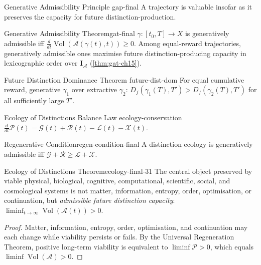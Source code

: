 \documentclass[12pt,twoside,openright]{book}
\newcommand{\adm}{\mathcal{A}}
\newcommand{\Vol}{\operatorname{Vol}}
\begin{document}
\begin{principle}{Generative Admissibility Principle}%
  {gap-final}
  A trajectory is valuable insofar as it preserves the
  capacity for future distinction-production.
\end{principle}

\begin{theorem}{Generative Admissibility Theorem}{gat-final}
  $\gamma:[t_0,T]\to X$ is generatively admissible iff
  $\frac{d}{dt}\Vol(\adm(\gamma(t),t))\ge0$.
  Among equal-reward trajectories, generatively admissible
  ones maximise future distinction-producing capacity in
  lexicographic order over $\mathbf{I}_\adm$
  (\cref{thm:gat-ch15}).
\end{theorem}

\begin{theorem}{Future Distinction Dominance Theorem}%
  {future-dist-dom}
  For equal cumulative reward, generative $\gamma_1$
  over extractive $\gamma_2$:
  $D_f(\gamma_1(T),T')>D_f(\gamma_2(T),T')$
  for all sufficiently large $T'$.
\end{theorem}

\begin{theorem}{Ecology of Distinctions Balance Law}%
  {ecology-conservation}
  $\frac{d}{dt}\mathcal{P}(t)
  =\mathcal{G}(t)+\mathcal{R}(t)
  -\mathcal{L}(t)-\mathcal{X}(t)$.
\end{theorem}

\begin{corollary}{Regenerative Condition}{regen-condition-final}
  A distinction ecology is generatively admissible iff
  $\mathcal{G}+\mathcal{R}\ge\mathcal{L}+\mathcal{X}$.
\end{corollary}

\begin{theorem}{Ecology of Distinctions Theorem}{ecology-final-31}
  The central object preserved by viable physical,
  biological, cognitive, computational, scientific,
  social, and cosmological systems is not matter,
  information, entropy, order, optimisation, or
  continuation, but \emph{admissible future distinction
  capacity}: $\liminf_{t\to\infty}\Vol(\adm(t))>0$.
\end{theorem}
\begin{proof}
  Matter, information, entropy, order, optimisation,
  and continuation may each change while viability
  persists or fails. By the Universal Regeneration
  Theorem, positive long-term viability is equivalent
  to $\liminf\mathcal{P}>0$, which equals
  $\liminf\Vol(\adm)>0$.
\end{proof}
\end{document}
